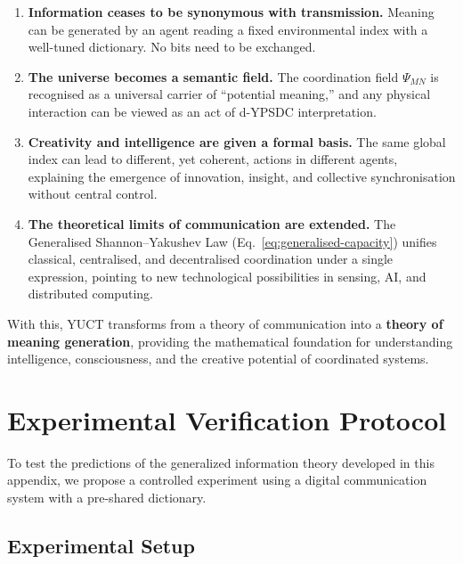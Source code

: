 \documentclass[12pt,a4paper]{article}
\theoremstyle{remark}
\begin{document}
	\begin{enumerate}[leftmargin=*]
		\item \textbf{Information ceases to be synonymous with transmission.}
		Meaning can be generated by an agent reading a fixed environmental index
		with a well-tuned dictionary. No bits need to be exchanged.
		\item \textbf{The universe becomes a semantic field.}
		The coordination field $\Psi_{MN}$ is recognised as a universal carrier of
		``potential meaning,'' and any physical interaction can be viewed as an act
		of d-YPSDC interpretation.
		\item \textbf{Creativity and intelligence are given a formal basis.}
		The same global index can lead to different, yet coherent, actions in
		different agents, explaining the emergence of innovation, insight, and
		collective synchronisation without central control.
		\item \textbf{The theoretical limits of communication are extended.}
		The Generalised Shannon--Yakushev Law (Eq.\ \ref{eq:generalised-capacity})
		unifies classical, centralised, and decentralised coordination under a single
		expression, pointing to new technological possibilities in sensing, AI, and
		distributed computing.
	\end{enumerate}
	
	With this, YUCT transforms from a theory of communication into a \textbf{theory
		of meaning generation}, providing the mathematical foundation for understanding
	intelligence, consciousness, and the creative potential of coordinated systems.
	
	\section{Experimental Verification Protocol}
	\label{sec:experiment}
	
	To test the predictions of the generalized information theory developed in this appendix, we propose a controlled experiment using a digital communication system with a pre-shared dictionary.
	
	\subsection{Experimental Setup}
	
\end{document}
